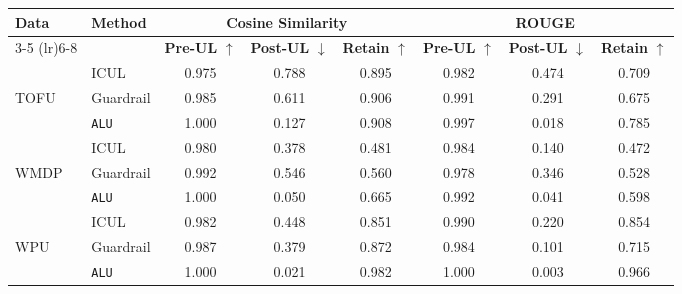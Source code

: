 \begin{table*}[]
    \centering
    \caption{Comparison of Methods using Cosine Similarity and ROUGE Metrics with Qwen2.5-32B-Instruct}
    \begin{tabular}{llccc|ccc}
        \toprule
        \textbf{Data}&\textbf{Method} & \multicolumn{3}{c}{\textbf{Cosine Similarity}} & \multicolumn{3}{c}{\textbf{ROUGE}} \\
        \cmidrule(lr){3-5} \cmidrule(lr){6-8}
         & & \textbf{Pre-UL} $\uparrow$ & \textbf{Post-UL} $\downarrow$ & \textbf{Retain} $\uparrow$ & \textbf{Pre-UL} $\uparrow$ & \textbf{Post-UL} $\downarrow$ & \textbf{Retain} $\uparrow$ \\
        \midrule
        &ICUL & 0.975 & 0.788 & 0.895 & 0.982 & 0.474 & 0.709 \\
        TOFU &Guardrail & 0.985 & 0.611 & 0.906 & 0.991 & 0.291 & 0.675 \\
        &\texttt{ALU}  & 1.000 & 0.127 & 0.908 & 0.997 & 0.018 & 0.785 \\
        \midrule
        &ICUL  & 0.980 & 0.378 & 0.481 & 0.984 & 0.140 & 0.472 \\
        WMDP & Guardrail & 0.992 & 0.546 & 0.560 & 0.978 & 0.346 & 0.528 \\
        &\texttt{ALU} & 1.000 & 0.050 & 0.665 & 0.992 & 0.041 & 0.598 \\
        \midrule
        &ICUL  & 0.982 & 0.448 & 0.851 & 0.990 & 0.220 & 0.854 \\
        WPU &Guardrail & 0.987 & 0.379 & 0.872 & 0.984 & 0.101 & 0.715 \\
        &\texttt{ALU} & 1.000 & 0.021 & 0.982 & 1.000 & 0.003 & 0.966 \\
        \bottomrule
    \end{tabular}
\label{tab:t29}    
\end{table*}

